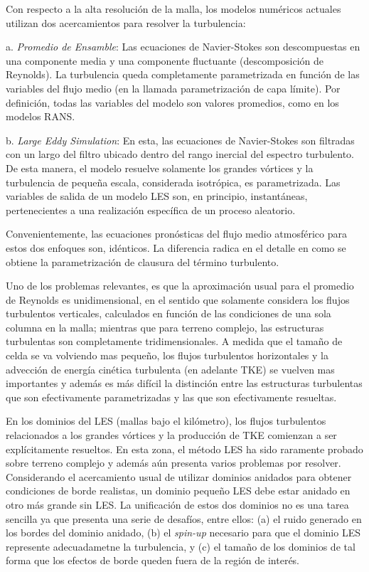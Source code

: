Con respecto a la alta resolución de la malla, los modelos numéricos actuales utilizan dos acercamientos para resolver la turbulencia:
\begin{enumerate*}
	\item[a.] \emph{Promedio de Ensamble}: Las ecuaciones de Navier-Stokes son descompuestas en una componente media y una componente fluctuante (descomposición de Reynolds). La turbulencia queda completamente parametrizada en función de las variables del flujo medio (en la llamada parametrización de capa límite). Por definición, todas las variables del modelo son valores promedios, como en los modelos RANS.
	\item[b.] \emph{Large Eddy Simulation}: En esta, las ecuaciones de Navier-Stokes son filtradas con un largo del filtro ubicado dentro del rango inercial del espectro turbulento. De esta manera, el modelo resuelve solamente los grandes vórtices y la turbulencia de pequeña escala, considerada isotrópica, es parametrizada. Las variables de salida de un modelo LES son, en principio, instantáneas, pertenecientes a una realización específica de un proceso aleatorio.
\end{enumerate*} 

Convenientemente, las ecuaciones pronósticas del flujo medio atmosférico para estos dos enfoques son, idénticos. La diferencia radica en el detalle en como se obtiene la parametrización de clausura del término turbulento.

Uno de los problemas relevantes, es que la aproximación usual para el promedio de Reynolds es unidimensional, en el sentido que solamente considera los flujos turbulentos verticales, calculados en función de las condiciones de una sola columna en la malla; mientras que para terreno complejo, las estructuras turbulentas son completamente tridimensionales. A medida que el tamaño de celda se va volviendo mas pequeño, los flujos turbulentos horizontales y la advección de energía cinética turbulenta (en adelante TKE) se vuelven mas importantes y además es más difícil la distinción entre las estructuras turbulentas que son efectivamente parametrizadas y las que son efectivamente resueltas. 

En los dominios del LES (mallas bajo el kilómetro), los flujos turbulentos relacionados a los grandes vórtices y la producción de TKE comienzan a ser explícitamente resueltos. En esta zona, el método LES ha sido raramente probado sobre terreno complejo y además aún presenta varios problemas por resolver. Considerando el acercamiento usual de utilizar dominios anidados para obtener condiciones de borde realistas, un dominio pequeño LES debe estar anidado en otro más grande sin LES. La unificación de estos dos dominios no es una tarea sencilla ya que presenta una serie de desafíos, entre ellos: (a) el ruido generado en los bordes del dominio anidado, (b) el \emph{spin-up} necesario para que el dominio LES represente adecuadametne la turbulencia, y (c) el tamaño de los dominios de tal forma que los efectos de borde queden fuera de la región de interés.

